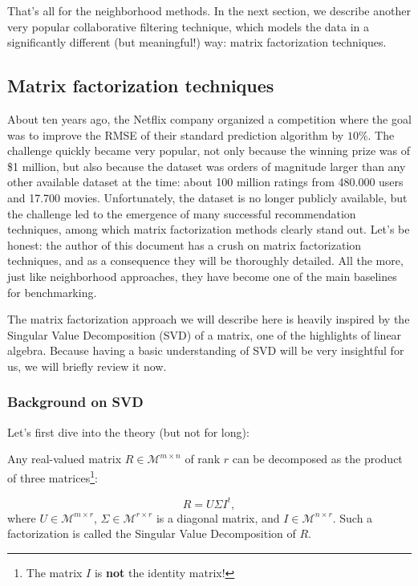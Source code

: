That's all for the neighborhood methods. In the next section, we describe
another very popular collaborative filtering technique, which models the data
in a significantly different (but meaningful!) way: matrix factorization
techniques.

\subsection{Matrix factorization techniques}
\label{SEC:matrix_facto}

About ten years ago, the Netflix company organized a competition where the goal
was to improve the RMSE of their standard prediction algorithm by $10\%$. The
challenge quickly became very popular, not only because the winning prize was
of \$1 million, but also because the dataset was orders of magnitude larger
than any other available dataset at the time: about 100 million ratings from
480.000 users and 17.700 movies. Unfortunately, the dataset is no longer
publicly available, but the challenge led to the emergence of many successful
recommendation techniques, among which matrix factorization methods clearly
stand out. Let's be honest: the author of this document has a crush on matrix
factorization techniques, and as a consequence they will be thoroughly
detailed. All the more, just like neighborhood approaches, they have become one
of the main baselines for benchmarking.

The matrix factorization approach we will describe here is heavily inspired by
the Singular Value Decomposition (SVD) of a matrix, one of the highlights of
linear algebra. Because having a basic understanding of SVD will be very
insightful for us, we will briefly review it now.

\subsubsection{Background on SVD}

Let's first dive into the
theory (but not for long):

\begin{proposition}
  Any real-valued matrix $R \in \mathcal{M}^{m \times n}$ of rank $r$ can be
  decomposed as the product of three matrices\footnote{The matrix $I$ is
  \textbf{not} the identity matrix!}:

  $$R = U\Sigma I^t,$$
  where $U\in \mathcal{M}^{m \times r}$, $\Sigma\in \mathcal{M}^{r \times r}$
  is a diagonal matrix, and $I\in \mathcal{M}^{n \times r}$. Such a
  factorization is called the Singular Value Decomposition of $R$.
\end{proposition}

